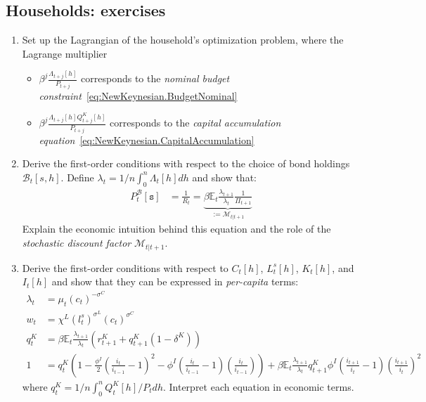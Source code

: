 \subsection{Households: exercises}
\begin{enumerate}
\item
Set up the Lagrangian of the household's optimization problem,
  where the Lagrange multiplier
  \begin{itemize}
  \item \(\beta^{j} \frac{\Lambda_{t+j}[h]}{P_{t+j}}\) corresponds to the \emph{nominal budget constraint}~\eqref{eq:NewKeynesian.BudgetNominal}
  \item \(\beta^{j} \frac{\Lambda_{t+j}[h] Q^{K}_{t+j}[h]}{P_{t+j}}\) corresponds to the \emph{capital accumulation equation}~\eqref{eq:NewKeynesian.CapitalAccumulation}
  \end{itemize}

\item
Derive the first-order conditions with respect to the choice of bond holdings \(\mathcal{B}_{t}[s,h]\).
Define \(\lambda_{t}=1/n \int_{0}^{n} \Lambda_{t}[h] dh\) and show that:
\begin{align}
P^{\mathcal{B}}_{t}[\mathtt{s}] &= \frac{1}{R_{t}} = \underbrace{\beta \mathbb{E}_{t} \frac{\lambda_{t+1}}{\lambda_{t}} \frac{1}{\Pi_{t+1}}}_{:= \mathcal{M}_{t|t+1}}
\label{eq:NewKeynesian.EulerBond}
\end{align}
Explain the economic intuition behind this equation and the role of the \emph{stochastic discount factor} \(\mathcal{M}_{t|t+1}\).

\item
Derive the first-order conditions with respect to \(C_{t}[h]\), \(L^{s}_{t}[h]\), \(K_{t}[h]\), and \(I_{t}[h]\)
  and show that they can be expressed in \emph{per-capita} terms:
\begin{align}
\lambda_t &= \mu_{t} {(c_{t})}^{-\sigma^{C}} \label{eq:NewKeynesian.MarginalUtility}
\\
w_{t} &= \chi^{L} {(l^{s}_{t})}^{\sigma^{L}} {(c_{t})}^{\sigma^{C}}
\label{eq:NewKeynesian.LaborSupply}
\\
q^{K}_{t} &= \beta \mathbb{E}_{t} \frac{\lambda_{t+1}}{\lambda_t} \left( r^{K}_{t+1} + q^{K}_{t+1} (1-\delta^{K}) \right)
\label{eq:NewKeynesian.EulerCapital}
\\
1 &= q^{K}_{t} \left(
  1 - \frac{\phi^{I}}{2} {\left(\frac{i_{t}}{i_{t-1}}-1\right)}^2
  - \phi^{I} \left(\frac{i_{t}}{i_{t-1}}-1\right) \left(\frac{i_{t}}{i_{t-1}}\right)
  \right)
  + \beta \mathbb{E}_{t} \frac{\lambda_{t+1}}{\lambda_t} q^{K}_{t+1} \phi^{I} \left(\frac{i_{t+1}}{i_{t}}-1\right) {\left(\frac{i_{t+1}}{i_{t}}\right)}^2
\label{eq:NewKeynesian.EulerInvestment}
\end{align}
where \(q^{K}_{t} = 1/n \int_{0}^{n} Q^{K}_{t}[h]/P_{t} dh\).
Interpret each equation in economic terms.


\end{enumerate}
